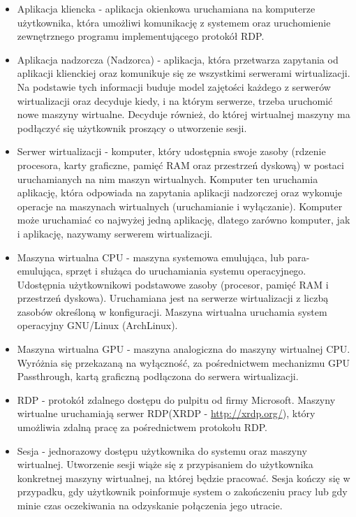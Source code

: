 \documentclass[../wstep.tex]{subfiles}
\begin{document}
\begin{itemize}
    \item Aplikacja kliencka - aplikacja okienkowa uruchamiana na komputerze użytkownika, która umożliwi komunikację z systemem oraz uruchomienie zewnętrznego programu implementującego protokół RDP.
    \item Aplikacja nadzorcza (Nadzorca) - aplikacja, która przetwarza zapytania od aplikacji klienckiej oraz komunikuje się ze wszystkimi serwerami wirtualizacji. Na podstawie tych informacji buduje model zajętości każdego z serwerów wirtualizacji oraz decyduje kiedy, i na którym serwerze, trzeba uruchomić nowe maszyny wirtualne. Decyduje również, do której wirtualnej maszyny ma podłączyć się użytkownik proszący o utworzenie sesji.
    \item Serwer wirtualizacji - komputer, który udostępnia swoje zasoby (rdzenie procesora, karty graficzne, pamięć RAM oraz przestrzeń dyskową) w postaci uruchamianych na nim maszyn wirtualnych. Komputer ten uruchamia aplikację, która odpowiada na zapytania aplikacji nadzorczej oraz wykonuje operacje na maszynach wirtualnych (uruchamianie i wyłączanie). Komputer może uruchamiać co najwyżej jedną aplikację, dlatego zarówno komputer, jak i aplikację, nazywamy serwerem wirtualizacji.
    \item Maszyna wirtualna CPU - maszyna systemowa emulująca, lub para-emulująca, sprzęt i służąca do uruchamiania systemu operacyjnego. Udostępnia użytkownikowi podstawowe zasoby (procesor, pamięć RAM i przestrzeń dyskowa). Uruchamiana jest na serwerze wirtualizacji z liczbą zasobów określoną w konfiguracji. Maszyna wirtualna uruchamia system operacyjny GNU/Linux (ArchLinux).
    \item Maszyna wirtualna GPU - maszyna analogiczna do maszyny wirtualnej CPU. Wyróżnia się przekazaną na wyłączność, za pośrednictwem mechanizmu GPU Passthrough, kartą graficzną podłączona do serwera wirtualizacji.
    \item RDP - protokół zdalnego dostępu do pulpitu od firmy Microsoft\parencite{rdp}. Maszyny wirtualne uruchamiają serwer RDP(XRDP - \url{http://xrdp.org/}), który umożliwia zdalną pracę za pośrednictwem protokołu RDP.
    \item Sesja - jednorazowy dostępu użytkownika do systemu oraz maszyny wirtualnej. Utworzenie sesji wiąże się z przypisaniem do użytkownika konkretnej maszyny wirtualnej, na której będzie pracować. Sesja kończy się w przypadku, gdy użytkownik poinformuje system o zakończeniu pracy lub gdy minie czas oczekiwania na odzyskanie połączenia jego utracie.

\end{itemize}
\end{document}

